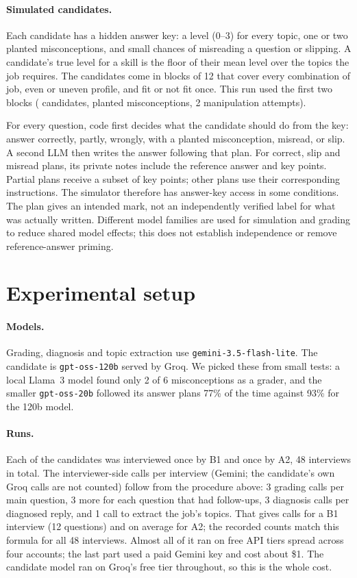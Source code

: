 \documentclass[11pt,a4paper]{article}
\begin{document}
\paragraph{Simulated candidates.} Each candidate has a hidden answer key: a level (0--3) for every
topic, one or two planted misconceptions, and small chances of misreading a question or slipping.
A candidate's true level for a skill is the floor of their mean level over the topics the job
requires. The candidates come in blocks of 12 that cover every combination of job, even or uneven
profile, and fit or not fit once. This run used the first two blocks (\nCandidates{} candidates,
\planted{} planted misconceptions, 2 manipulation attempts).

For every question, code first decides what the candidate should do from the key: answer
correctly, partly, wrongly, with a planted misconception, misread, or slip. A second LLM then writes
the answer following that plan. For correct, slip and misread plans, its private notes include
the reference answer and key points. Partial plans receive a subset of key points; other plans
use their corresponding instructions. The simulator therefore has answer-key access in some
conditions. The plan gives an intended mark, not an independently verified label for what was
actually written. Different model families are used for simulation and grading to reduce shared
model effects; this does not establish independence or remove reference-answer priming.

\section{Experimental setup}

\paragraph{Models.} Grading, diagnosis and topic extraction use \texttt{gemini-3.5-flash-lite}.
The candidate is \texttt{gpt-oss-120b} served by Groq. We picked these from small tests: a local
Llama~3 model found only 2 of 6 misconceptions as a grader, and the smaller \texttt{gpt-oss-20b}
followed its answer plans 77\% of the time against 93\% for the 120b model.

\paragraph{Runs.} Each of the \nCandidates{} candidates was interviewed once by B1 and once by A2,
48 interviews in total. The interviewer-side calls per interview (Gemini; the candidate's own
Groq calls are not counted) follow from the procedure above: 3 grading calls
per main question, 3 more for each question that had follow-ups, 3 diagnosis calls per diagnosed
reply, and 1 call to extract the job's topics. That gives \callsBase{} calls for a B1 interview
(12 questions) and \callsOurs{} on average for A2; the recorded counts match this formula for all
48 interviews. Almost all of it ran on free API tiers spread across
four accounts; the last part used a paid Gemini key and cost about \$1. The candidate model ran
on Groq's free tier throughout, so this is the whole cost.
\end{document}
